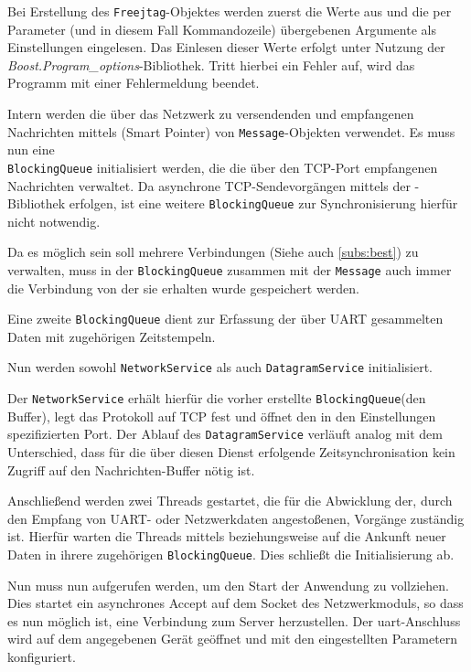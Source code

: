 Bei Erstellung des \texttt{Freejtag}-Objektes werden zuerst die Werte aus
 und die per Parameter (und in diesem Fall
Kommandozeile) übergebenen Argumente als Einstellungen eingelesen.
Das Einlesen dieser Werte erfolgt unter Nutzung der
\emph{Boost.Program\_options}-Bibliothek. Tritt hierbei ein Fehler auf, wird das
Programm mit einer Fehlermeldung beendet.

Intern werden die über das Netzwerk zu versendenden und empfangenen Nachrichten
mittels (Smart Pointer) von
\texttt{Message}-Objekten verwendet. Es muss nun eine \\\texttt{BlockingQueue}
initialisiert werden, die die über den TCP-Port empfangenen Nachrichten
verwaltet. Da asynchrone TCP-Sendevorgängen mittels der
-Bibliothek erfolgen, ist eine weitere
\texttt{BlockingQueue} zur Synchronisierung hierfür nicht notwendig.

Da es möglich sein soll mehrere Verbindungen (Siehe auch \autoref{subs:best}) zu
verwalten, muss in der \texttt{BlockingQueue} zusammen mit der \texttt{Message}
auch immer die Verbindung von der sie erhalten wurde gespeichert werden.

Eine zweite \texttt{BlockingQueue} dient zur Erfassung der über UART gesammelten
Daten mit zugehörigen Zeitstempeln. 

Nun werden sowohl \texttt{NetworkService} als auch \texttt{DatagramService}
initialisiert.

Der \texttt{NetworkService} erhält hierfür die vorher erstellte
\texttt{BlockingQueue}(den Buffer), legt das Protokoll auf TCP fest und
öffnet den in den Einstellungen spezifizierten Port. Der Ablauf des
\texttt{DatagramService} verläuft analog mit dem Unterschied, dass für die über
diesen Dienst erfolgende Zeitsynchronisation kein Zugriff auf den
Nachrichten-Buffer nötig ist.

Anschließend werden zwei Threads gestartet, die für die Abwicklung der, durch
den Empfang von UART- oder Netzwerkdaten angestoßenen, Vorgänge zuständig
ist. Hierfür warten die Threads mittels  beziehungsweise \newline{} auf die Ankunft neuer Daten in ihrere zugehörigen
\texttt{BlockingQueue}. Dies schließt die Initialisierung ab.

Nun muss nun  aufgerufen werden, um den Start der
Anwendung zu vollziehen. Dies startet ein asynchrones Accept auf dem Socket des
Netzwerkmoduls, so dass es nun möglich ist, eine Verbindung zum Server
herzustellen. Der \gls{uart}-Anschluss wird auf dem angegebenen Gerät geöffnet
und mit den eingestellten Parametern konfiguriert.

